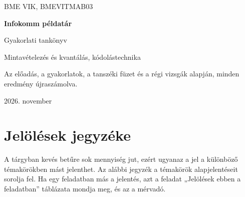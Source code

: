 

\frontmatter
\begin{titlepage}
\centering
\vspace*{30mm}
{\sffamily\large BME VIK, BMEVITMAB03\par}
\vspace{8mm}
{\sffamily\bfseries\Huge Infokomm példatár\par}
\vspace{6mm}
{\sffamily\Large Gyakorlati tankönyv\par}
\vspace{6mm}
{\large Mintavételezés és kvantálás, kódolástechnika\par}
\vspace{14mm}
\vfill
{\small Az előadás, a gyakorlatok, a tanszéki füzet és a régi vizsgák alapján, minden eredmény újraszámolva.\par}
\vspace{8mm}
{\small 2026. november\par}
\end{titlepage}

\tableofcontents
\mainmatter
\chapter*{Jelölések jegyzéke}
A tárgyban kevés betűre sok mennyiség jut, ezért ugyanaz a jel a különböző témakörökben mást jelenthet. Az alábbi jegyzék a témakörök alapjelentéseit sorolja fel. Ha egy feladatban más a jelentés, azt a feladat „Jelölések ebben a feladatban” táblázata mondja meg, és az a mérvadó.

